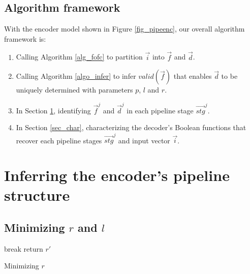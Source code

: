 \documentclass[conference]{IEEEtran}
\begin{document}
\subsection{Algorithm framework}

With the encoder model shown in Figure \ref{fig_pipeenc},
our overall algorithm framework is:

\begin{enumerate}
 \item Calling Algorithm \ref{alg_fofc} to partition $\vec{i}$ into $\vec{f}$ and $\vec{d}$.
 \item Calling Algorithm \ref{algo_infer} to infer $valid(\vec{f})$ that enables $\vec{d}$ 
 to be uniquely determined with parameters $p$, $l$ and $r$.
 \item In Section \ref{sec_pipeinfer}, 
 identifying $\vec{f}^j$ and $\vec{d}^j$ in each pipeline stage $\vec{stg}^j$. 
 \item In Section \ref{sec_char}, 
 characterizing the decoder's Boolean functions that recover each pipeline stages $\vec{stg}^j$
 and input vector $\vec{i}$.
\end{enumerate}



\section{Inferring the encoder's pipeline structure}\label{sec_pipeinfer}


\subsection{Minimizing $r$ and $l$}\label{reduceing}

\begin{algorithm}[t]
\SetAlgoVlined
{} {
   {
    break
  }
}
return $r'$
\caption{Minimizing $r$}
\label{algo_remove2}
\end{algorithm}
\end{document}
